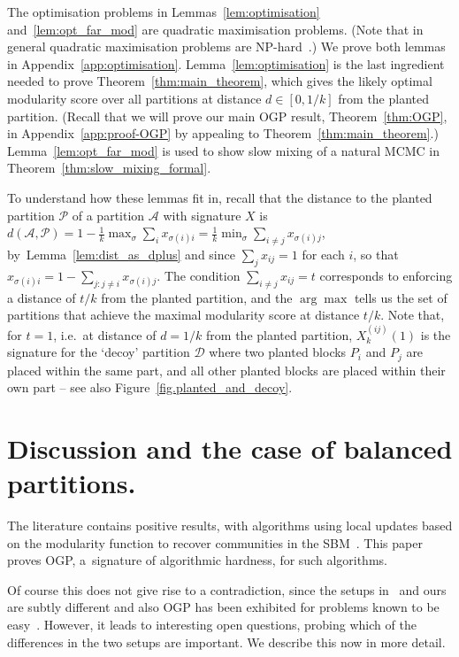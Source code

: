\documentclass[a4paper,UKenglish,cleveref, autoref, thm-restate,numberwithinsect]{lipics-v2021}
\newcommand{\cA}{\mathcal{A}}
\newcommand{\cD}{\mathcal{D}}
\newcommand{\cP}{\mathcal{P}}
\newcommand{\Fc}{
}
\begin{document}
The optimisation problems in Lemmas~\ref{lem:optimisation} and~\ref{lem:opt_far_mod} are quadratic maximisation problems. (Note that in general quadratic maximisation problems are NP-hard~\cite{sahni1974computationally}.) We prove both lemmas in Appendix~\ref{app:optimisation}. Lemma~\ref{lem:optimisation} is the last ingredient needed to prove Theorem~\ref{thm:main_theorem}, which gives the likely optimal modularity score over all partitions at distance $d\in[0,1/k]$ from the planted partition. (Recall that we will prove our main OGP result, Theorem~\ref{thm:OGP}, in Appendix~\ref{app:proof-OGP} by appealing to Theorem~\ref{thm:main_theorem}.) {\Fc Lemma~\ref{lem:opt_far_mod} is used to show slow mixing of a natural MCMC in Theorem~\ref{thm:slow_mixing_formal}.}

To understand how these lemmas fit in, recall that the distance to the planted partition $\cP$ of a partition $\cA$ with signature $X$ is $d(\cA,\cP)=1-\frac{1}{k}\max_{\sigma}\sum_{i} x_{\sigma(i)i}=\frac{1}{k}\min_{\sigma} \sum_{i\neq j} x_{\sigma(i)j}$, by~Lemma~\ref{lem:dist_as_dplus} and since $\sum_j x_{ij}=1$ for each $i$, so that $x_{\sigma(i)i}=1-\sum_{j\colon j\neq i}x_{\sigma(i)j}$. The condition $\sum_{i\neq j} x_{ij} = t$ corresponds to enforcing a distance of $t/k$ from the planted partition, and the $\arg \max$ tells us the set of partitions that achieve the maximal modularity score at distance $t/k$. Note that, for $t=1$, i.e.\ at distance of $d=1/k$ from the planted partition, $X^{(ij)}_k(1)$ is the signature for the `decoy' partition $\cD$ where two planted blocks $P_i$ and $P_j$ are placed within the same part, and all other planted blocks are placed within their own part -- see also Figure~\ref{fig.planted_and_decoy}.



\section{Discussion and the case of balanced partitions.
}\label{sec.conj}
The literature contains positive results, with algorithms using local updates based on the modularity function to recover communities in the SBM~\cite{cohen2020power,cohen2022massively}. This paper proves OGP, a~signature of algorithmic hardness, for such algorithms. 

Of course this does not give rise to a contradiction, since the setups in~\cite{cohen2020power,cohen2022massively} and ours are subtly different and also OGP has been exhibited for problems known to be easy~\cite{li2024some}. However, it leads to interesting open questions, probing which of the differences in the two setups are important. We describe this now in more detail.
\end{document}
